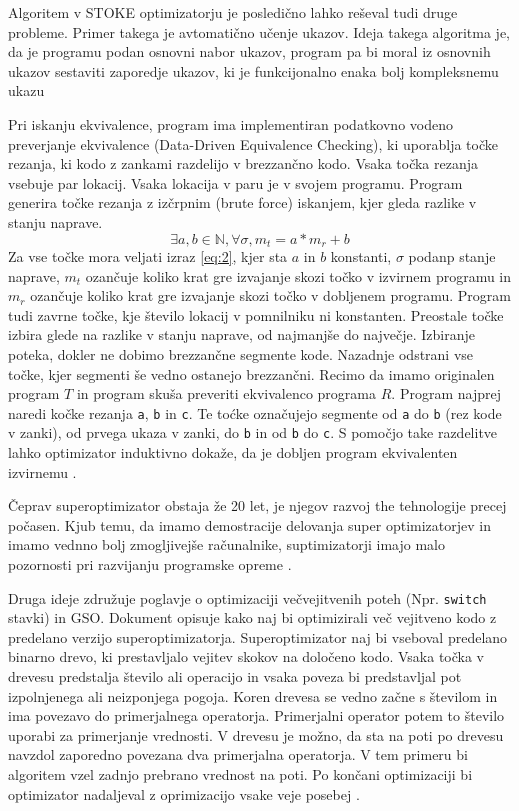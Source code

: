 \documentclass[a4paper, 12pt]{book}
\begin{document}
Algoritem v STOKE optimizatorju je posledično lahko reševal tudi druge probleme. Primer takega je avtomatično učenje ukazov. Ideja takega algoritma je, da je programu podan osnovni nabor ukazov, program pa bi moral iz osnovnih ukazov sestaviti zaporedje ukazov, ki je funkcijonalno enaka bolj kompleksnemu ukazu \cite{article4}

Pri iskanju ekvivalence, program ima implementiran  podatkovno vodeno preverjanje ekvivalence (Data-Driven Equivalence Checking), ki uporablja točke rezanja, ki kodo z zankami razdelijo v brezzančno kodo. Vsaka točka rezanja vsebuje par lokacij. Vsaka lokacija v paru je v svojem programu. Program generira točke rezanja z izčrpnim (brute force) iskanjem, kjer gleda razlike v stanju naprave. 
\begin{equation}
\exists{a,b} \in \mathbb{N}, \forall \sigma  ,m_t = a*m_r + b 
\label{eq:2}
\end{equation}
Za vse točke mora veljati izraz \ref{eq:2}, kjer sta $a$ in $b$ konstanti, $\sigma$ podanp stanje naprave, $m_t$ ozančuje koliko krat gre izvajanje skozi točko v izvirnem programu in $m_r$ ozančuje koliko krat gre izvajanje skozi točko v dobljenem programu. Program tudi zavrne točke, kje število lokacij v pomnilniku ni konstanten. Preostale točke izbira glede na razlike v stanju naprave, od najmanjše do največje. Izbiranje poteka, dokler ne dobimo brezzančne segmente kode. Nazadnje odstrani vse točke, kjer segmenti še vedno ostanejo brezzančni. Recimo da imamo originalen program $T$ in program skuša preveriti ekvivalenco programa $R$. Program najprej naredi kočke rezanja \texttt{a}, \texttt{b} in \texttt{c}. Te toćke označujejo segmente od \texttt{a} do \texttt{b} (rez kode v zanki), od prvega ukaza v zanki, do \texttt{b} in od \texttt{b} do \texttt{c}. S pomočjo take razdelitve lahko optimizator induktivno dokaže, da je dobljen program ekvivalenten izvirnemu \cite{article2}.

Čeprav superoptimizator obstaja že 20 let, je njegov razvoj the tehnologije precej počasen. Kjub temu, da imamo demostracije delovanja super optimizatorjev in imamo vednno bolj zmogljivejše računalnike, suptimizatorji imajo malo pozornosti pri razvijanju programske opreme \cite{pdf4}.

Druga ideje združuje poglavje o optimizaciji večvejitvenih poteh (Npr. \texttt{switch} stavki) in GSO. Dokument \cite{branch} opisuje kako naj bi optimizirali več vejitveno kodo z predelano verzijo superoptimizatorja. Superoptimizator naj bi vseboval predelano binarno drevo, ki prestavljalo vejitev skokov na določeno kodo. Vsaka točka v drevesu predstalja število ali operacijo in vsaka poveza bi predstavljal pot izpolnjenega ali neizponjega pogoja. Koren drevesa se vedno začne s številom in ima povezavo do primerjalnega operatorja. Primerjalni operator potem to število uporabi za primerjanje vrednosti. V drevesu je možno, da sta na poti po drevesu navzdol zaporedno povezana dva primerjalna operatorja. V tem primeru bi algoritem vzel zadnjo prebrano vrednost na poti. Po končani optimizaciji bi optimizator nadaljeval z oprimizacijo vsake veje posebej \cite{branch}.
\end{document}

